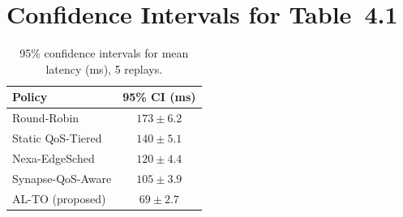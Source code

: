 \section{Confidence Intervals for Table~4.1}
\begin{table}[htb]
\centering
\caption{95\% confidence intervals for mean latency (ms), 5 replays.}
\renewcommand{\arraystretch}{1.25}
\begin{tabular}{lc}
\toprule
\rowcolor{bitsnavy}
{\color{white}\textbf{Policy}} & {\color{white}\textbf{95\% CI (ms)}} \\
\midrule
Round-Robin        & $173 \pm 6.2$ \\
Static QoS-Tiered  & $140 \pm 5.1$ \\
Nexa-EdgeSched      & $120 \pm 4.4$ \\
Synapse-QoS-Aware   & $105 \pm 3.9$ \\
\rowcolor{bitspale}
AL-TO (proposed)   & $69 \pm 2.7$ \\
\bottomrule
\end{tabular}
\end{table}
